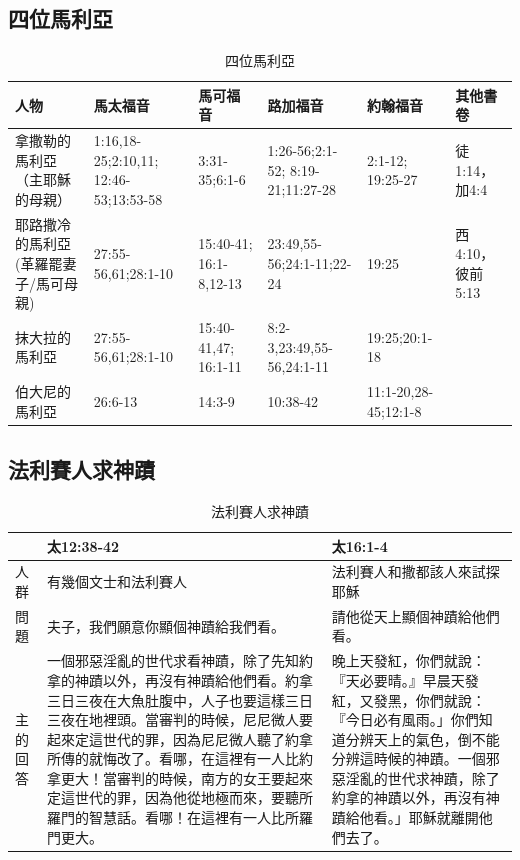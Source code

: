 \subsection{四位馬利亞}
\begin{table}[H]
  \centering
    \begin{tabular}{p{10.22em}|p{8.72em}|p{6.055em}|p{7.61em}|p{5.055em}|p{4.72em}}    \toprule
    \multicolumn{1}{p{10.22em}|}{人物} & 馬太福音  & 馬可福音  & 路加福音  & 約翰福音  & \multicolumn{1}{l}{其他書卷} \\    \midrule
    \multicolumn{1}{p{10.22em}|}{拿撒勒的馬利亞（主耶穌的母親）} & 1:16,18-25;2:10,11; 12:46-53;13:53-58 & 3:31-35;6:1-6 &1:26-56;2:1-52; 8:19-21;11:27-28 &2:1-12; 19:25-27&徒1:14，加4:4 \\    \midrule
    \multicolumn{1}{p{10.22em}|}{耶路撒冷的馬利亞(革羅罷妻子/馬可母親)} & 27:55-56,61;28:1-10 & 15:40-41; 16:1-8,12-13 & 23:49,55-56;24:1-11;22-24 & 19:25 & 西4:10，彼前5:13 \\    \midrule
    抹大拉的馬利亞 & 27:55-56,61;28:1-10 & 15:40-41,47; 16:1-11 & 8:2-3,23:49,55-56,24:1-11 & 19:25;20:1-18 &  \\    \midrule
    伯大尼的馬利亞 & 26:6-13  & 14:3-9 &10:38-42 &11:1-20,28-45;12:1-8 &  \\
    \bottomrule
    \end{tabular}%
     \caption{四位馬利亞}
  \label{tab:addlabel}%
\end{table}%



\subsection{法利賽人求神蹟}

\begin{table}[H]
  \centering
  \begin{tabular}{p{4.2em}|p{22.3em}|p{15.3em}}  
  \toprule
    &   太12:38-42  
    &   太16:1-4   \\    \midrule
   人群 & 有幾個文士和法利賽人& 法利賽人和撒都該人來試探耶穌  \\    \midrule
    問題 & 夫子，我們願意你顯個神蹟給我們看。 & 請他從天上顯個神蹟給他們看。 \\
    \midrule
   主的回答 & 一個邪惡淫亂的世代求看神蹟，除了先知約拿的神蹟以外，再沒有神蹟給他們看。約拿三日三夜在大魚肚腹中，人子也要這樣三日三夜在地裡頭。當審判的時候，尼尼微人要起來定這世代的罪，因為尼尼微人聽了約拿所傳的就悔改了。看哪，在這裡有一人比約拿更大！當審判的時候，南方的女王要起來定這世代的罪，因為他從地極而來，要聽所羅門的智慧話。看哪！在這裡有一人比所羅門更大。& 晚上天發紅，你們就說：『天必要晴。』早晨天發紅，又發黑，你們就說：『今日必有風雨。」你們知道分辨天上的氣色，倒不能分辨這時候的神蹟。一個邪惡淫亂的世代求神蹟，除了約拿的神蹟以外，再沒有神蹟給他看。」耶穌就離開他們去了。\\    \bottomrule
    \end{tabular}%
  \label{tab:addlabel}%
 \caption{法利賽人求神蹟}  
\end{table}%


